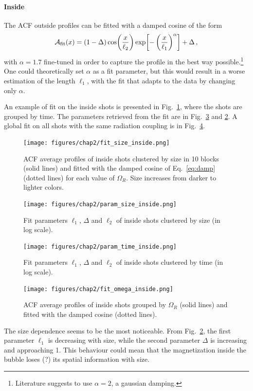 \paragraph{Inside}
The ACF outside profiles can be fitted with a damped cosine of the form
\begin{equation}
    \mathcal{A}_{\rm fit}(x) = (1 - \Delta)\cos(\frac{x}{\ell_2})\exp[-\left(\frac{x}{\ell_1}\right)^\alpha] + \Delta\, ,
    \label{eq:damp}
\end{equation}
with $\alpha = 1.7$ fine-tuned in order to capture the profile in the best way possible.\footnote{Literature suggests to use $\alpha = 2$, a gaussian damping.} One could theoretically set $\alpha$ as a fit parameter, but this would result in a worse estimation of the length $\ell_1$, with the fit that adapts to the data by changing only $\alpha$.

An example of fit on the inside shots is presented in Fig.\ \ref{fig:fit_time_inside}, where the shots are grouped by time. The parameters retrieved from the fit are in Fig.\ \ref{fig:param_time_inside} and \ref{fig:param_size_inside}. A global fit on all shots with the same radiation coupling is in Fig.\ \ref{fig:fit_omega_inside}.
\begin{figure}[h!]
    \centering
    \texttt{[image: figures/chap2/fit\_size\_inside.png]}
    \caption{ACF average profiles of inside shots clustered by size in 10 blocks (solid lines) and fitted with the damped cosine of Eq.\ \eqref{eq:damp} (dotted lines) for each value of $\Omega_R$. Size increases from darker to lighter colors.}
    \label{fig:fit_time_inside}
\end{figure}
\begin{figure}[h!]
    \centering
    \texttt{[image: figures/chap2/param\_size\_inside.png]}
    \caption{Fit parameters $\ell_1$, $\Delta$ and $\ell_2$ of inside shots clustered by size (in log scale).}
    \label{fig:param_size_inside}
\end{figure}
\begin{figure}[h!]
    \centering
    \texttt{[image: figures/chap2/param\_time\_inside.png]}
    \caption{Fit parameters $\ell_1$, $\Delta$ and $\ell_2$ of inside shots clustered by time (in log scale).}
    \label{fig:param_time_inside}
\end{figure}
\begin{figure}[h!]
    \centering
    \texttt{[image: figures/chap2/fit\_omega\_inside.png]}
    \caption{ACF average profiles of inside shots grouped by $\Omega_R$ (solid lines) and fitted with the damped cosine (dotted lines).}
    \label{fig:fit_omega_inside}
\end{figure}
The size dependence seems to be the most noticeable. From Fig.\ \ref{fig:param_size_inside}, the first parameter $\ell_1$ is decreasing with size, while the second parameter $\Delta$ is increasing and approaching 1. This behaviour could mean that the magnetization inside the bubble loses (?) its spatial information with size.

